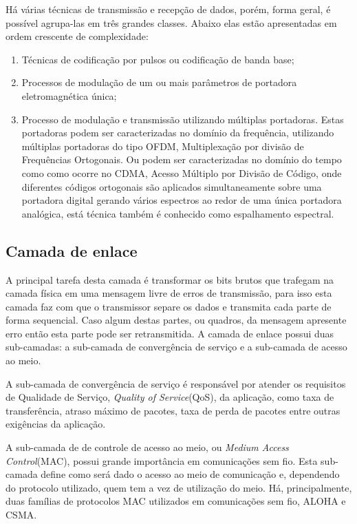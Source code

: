 Há várias técnicas de transmissão e recepção de dados, porém, forma geral, é possível agrupa-las em três grandes classes. Abaixo elas estão apresentadas em ordem crescente de complexidade:
\begin{enumerate}
      \item Técnicas de codificação por pulsos ou codificação de banda base;
      \item Processos de modulação de um ou mais parâmetros de portadora eletromagnética única;
      \item Processo de modulação e transmissão utilizando múltiplas portadoras. Estas portadoras podem ser caracterizadas no domínio da frequência, utilizando múltiplas portadoras do tipo OFDM, Multiplexação por divisão de Frequências Ortogonais. Ou podem ser caracterizadas no domínio do tempo como como ocorre no CDMA, Acesso Múltiplo por Divisão de Código, onde diferentes códigos ortogonais são aplicados simultaneamente sobre uma portadora digital gerando vários espectros ao redor de uma única portadora analógica, está técnica também é conhecido como espalhamento espectral.
\end{enumerate}

\subsection{Camada de enlace}
A principal tarefa desta camada é transformar os bits brutos que trafegam na camada física em uma mensagem livre de erros de transmissão, para isso esta camada faz com que o transmissor separe os dados e transmita cada parte de forma sequencial. Caso algum destas partes, ou quadros, da mensagem apresente erro então esta parte pode ser retransmitida. A camada de enlace possui duas sub-camadas: a sub-camada de convergência de serviço e a sub-camada de acesso ao meio.

A sub-camada de convergência de serviço é responsável por atender os requisitos de Qualidade de Serviço, \emph{Quality of Service}(QoS), da aplicação, como taxa de transferência, atraso máximo de pacotes, taxa de perda de pacotes entre outras exigências da aplicação.

A sub-camada de de controle de acesso ao meio, ou \emph{Medium Access Control}(MAC), possui grande importância em comunicações sem fio. Esta sub-camada define como será dado o acesso ao meio de comunicação e, dependendo do protocolo utilizado, quem tem a vez de utilização do meio. Há, principalmente, duas famílias de protocolos MAC utilizados em comunicações sem fio, ALOHA e CSMA.


